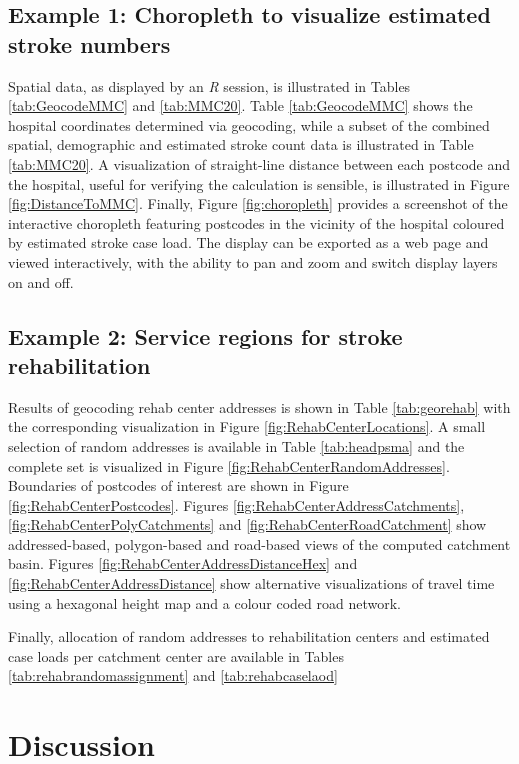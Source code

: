 \documentclass[utf8]{frontiersHLTH}
\begin{document}
\subsection{Example 1: Choropleth to visualize estimated stroke numbers}
Spatial data, as displayed by an {\em R} session, is illustrated in
Tables \ref{tab:GeocodeMMC} and \ref{tab:MMC20}. Table
\ref{tab:GeocodeMMC} shows the hospital
coordinates determined via geocoding, while a subset of the combined spatial,
demographic and estimated stroke count data is illustrated in Table
\ref{tab:MMC20}. A visualization of straight-line distance between
each postcode and the hospital, useful for verifying the calculation
is sensible, is illustrated in Figure
\ref{fig:DistanceToMMC}. Finally, Figure \ref{fig:choropleth} provides
a screenshot of the interactive choropleth featuring postcodes in the
vicinity of the hospital coloured by estimated stroke case load. The display
can be exported as a web page and viewed interactively, with the ability to
pan and zoom and switch display layers on and off.

\subsection{Example 2: Service regions for stroke rehabilitation}
Results of geocoding rehab center addresses is shown in Table
\ref{tab:georehab} with the corresponding visualization in Figure
\ref{fig:RehabCenterLocations}. A small selection of random addresses
is available in Table \ref{tab:headpsma} and the complete set is
visualized in Figure \ref{fig:RehabCenterRandomAddresses}. Boundaries
of postcodes of interest are shown in Figure
\ref{fig:RehabCenterPostcodes}. Figures
\ref{fig:RehabCenterAddressCatchments},
\ref{fig:RehabCenterPolyCatchments} and \ref{fig:RehabCenterRoadCatchment}
show addressed-based, polygon-based and road-based views of the
computed catchment basin. Figures
\ref{fig:RehabCenterAddressDistanceHex} and
\ref{fig:RehabCenterAddressDistance} show alternative visualizations
of travel time using a hexagonal height map and a colour coded road
network.

Finally, allocation of random addresses to rehabilitation centers and
estimated case loads per catchment center are available in Tables
\ref{tab:rehabrandomassignment} and \ref{tab:rehabcaselaod}

\section{Discussion}\label{discussion}
\end{document}
